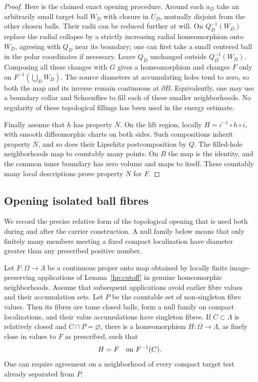 \begin{proof}
Here is the claimed exact opening procedure.  Around each $a_D$ take
an arbitrarily small target ball $W_D$ with closure in $U_D$, mutually
disjoint from the other chosen balls.  Their radii can be reduced
further at will.  On $Q_D^{-1}(W_D)$ replace the radial collapse by
a strictly increasing radial homeomorphism onto $W_D$, agreeing
with $Q_D$ near its boundary; one can first take a small centered
ball in the polar coordinates if necessary.  Leave $Q_D$ unchanged
outside $Q_D^{-1}(W_D)$.  Composing all these changes with $G$ gives
a homeomorphism and changes $F$ only on $F^{-1}(\bigcup_D W_D)$.
The source diameters at accumulating holes tend to zero, so both
the map and its inverse remain continuous at $\partial B$.
Equivalently, one may use a boundary collar and Schoenflies to fill
each of these smaller neighborhoods.  No regularity of these
topological fillings has been used in the energy estimate.

Finally assume that $h$ has property $N$.  On the lift region,
locally $H=i^{-1}\circ h\circ i$, with smooth diffeomorphic charts
on both sides.  Such compositions inherit property $N$, and so
does their Lipschitz postcomposition by $Q$.  The filled-hole
neighborhoods map to countably many points.  On $B$ the map is the
identity, and the common inner boundary has zero volume and maps
to itself.  These countably many local descriptions prove property
$N$ for $F$.
\end{proof}

\subsection{Opening isolated ball fibres}

We record the precise relative form of the topological opening that is
used both during and after the carrier construction.  A null family
below means that only finitely many members meeting a fixed compact
localization have diameter greater than any prescribed positive
number.

\begin{lemma}\label{hp:opening}
Let $F:\Omega\to\Lambda$ be a continuous proper onto map obtained by
locally finite image-preserving applications of
Lemma~\ref{hp:cutoff} in genuine homeomorphic neighborhoods.  Assume
that subsequent applications avoid earlier fibre values and their
accumulation sets.  Let $P$ be the countable set of non-singleton
fibre values.  Then its fibres are tame closed balls, form a null
family on compact localizations, and their value accumulations have
singleton fibres.  If $C\subset\Lambda$ is relatively closed and
$C\cap P=\varnothing$, there is a homeomorphism
$H:\Omega\to\Lambda$, as finely close in values to $F$ as prescribed,
such that
\begin{equation}\label{hp:relative-opening-agreement}
 H=F\quad\hbox{on }F^{-1}(C).
\end{equation}
One can require agreement on a neighborhood of every compact target
test already separated from $P$.
\end{lemma}

